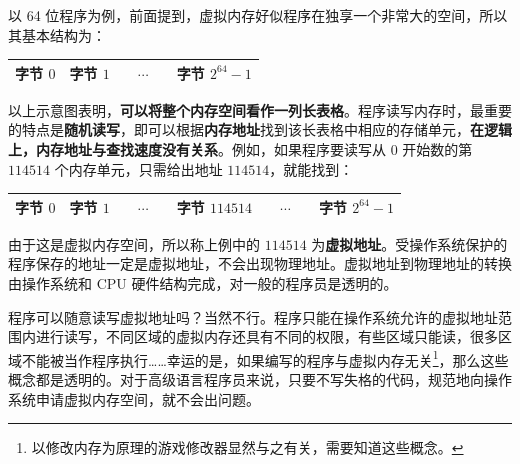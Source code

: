 以 64 位程序为例，前面提到，虚拟内存好似程序在独享一个非常大的空间，所以其基本结构为：
\begin{table}[H]
	\centering
	\begin{tabular}{|c|c|ccc|c|}
		\hline
		字节 $0$ & 字节 $1$ &  & $\cdots$ &  & 字节 $2^{64} - 1$
		\\\hline
	\end{tabular}
\end{table}

以上示意图表明，\textbf{可以将整个内存空间看作一列长表格}。程序读写内存时，最重要的特点是\textbf{随机读写}，即可以根据\textbf{内存地址}找到该长表格中相应的存储单元，\textbf{在逻辑上，内存地址与查找速度没有关系}。例如，如果程序要读写从 $0$ 开始数的第 $114514$ 个内存单元，只需给出地址 $114514$，就能找到：
\begin{table}[H]
	\centering
	\begin{tabular}{|c|c|ccc|c|ccc|c|}
		\hline
		字节 $0$ & 字节 $1$ &  & $\cdots$ &  & 字节 $114514$ &  & $\cdots$ &  & 字节 $2^{64} - 1$
		\\\hline
	\end{tabular}
\end{table}

由于这是虚拟内存空间，所以称上例中的 $114514$ 为\textbf{虚拟地址}。受操作系统保护的程序保存的地址一定是虚拟地址，不会出现物理地址。虚拟地址到物理地址的转换由操作系统和 CPU 硬件结构完成，对一般的程序员是透明的。

程序可以随意读写虚拟地址吗？当然不行。程序只能在操作系统允许的虚拟地址范围内进行读写，不同区域的虚拟内存还具有不同的权限，有些区域只能读，很多区域不能被当作程序执行……幸运的是，如果编写的程序与虚拟内存无关\footnote{以修改内存为原理的游戏修改器显然与之有关，需要知道这些概念。}，那么这些概念都是透明的。对于高级语言程序员来说，只要不写失格的代码，规范地向操作系统申请虚拟内存空间，就不会出问题。